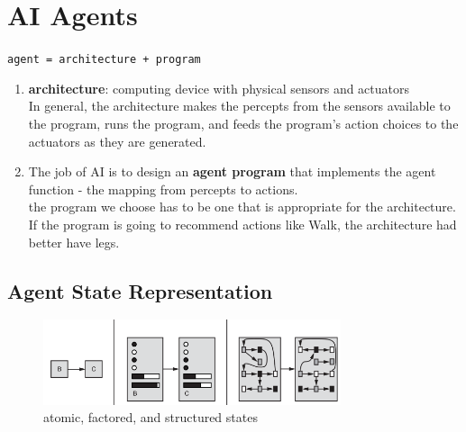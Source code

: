 \chapter{AI Agents \cite{aci-1}}

\begin{center}
    \texttt{agent = architecture + program}
\end{center}

\begin{enumerate}
    \item \textbf{architecture}: computing device with physical sensors and actuators\\
    In general, the architecture makes the percepts from the sensors available to the program, runs the program, and feeds the program’s action choices to the actuators as they are generated.
    
    \item The job of AI is to design an \textbf{agent program} that implements the agent function - the mapping from percepts to actions.\\
    the program we choose has to be one that is appropriate for the architecture.\\
    If the program is going to recommend actions like Walk, the architecture had better have legs. 
\end{enumerate}

\section{Agent State Representation \cite{aci-1}}

\begin{figure}[H]
    \centering
    \includegraphics[width=\linewidth, height=2.5cm, keepaspectratio]{Pictures/ai-ml/agent-state-repr.png}
    \caption*{atomic, factored, and structured states}
\end{figure}

